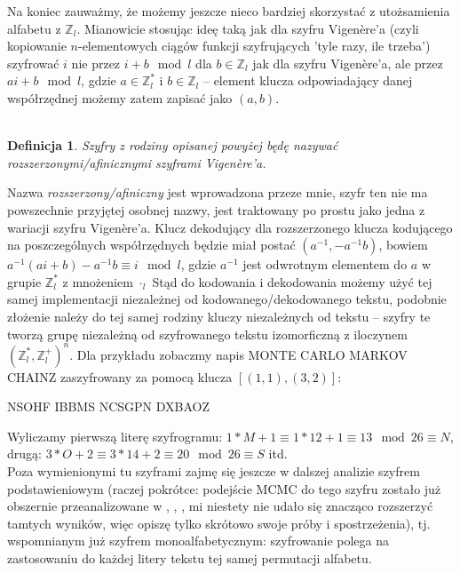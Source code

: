 \documentclass[a4paper]{article}
\theoremstyle{defn}
\newtheorem{defn}{Definicja}[subsection]
\theoremstyle{theorem}
\theoremstyle{lemma}
\theoremstyle{cor}
\theoremstyle{fact}
\begin{document}
Na koniec zauważmy, że możemy jeszcze nieco bardziej skorzystać z utożsamienia alfabetu z $\mathbb{Z}_l$. Mianowicie stosując ideę taką jak dla szyfru Vigenère'a (czyli kopiowanie $n$-elementowych ciągów funkcji szyfrujących 'tyle razy, ile trzeba') szyfrować $i$ nie przez $i+b \mod l$ dla $b \in \mathbb{Z}_l$ jak dla szyfru Vigenère'a, ale przez $ai+b \mod l$, gdzie $a \in \mathbb{Z}_l^*$ i $b \in \mathbb{Z}_l$ – element klucza odpowiadający danej współrzędnej możemy zatem zapisać jako $(a,b)$. \\\\
\begin{defn}\label{defn4.2.3}
Szyfry z rodziny opisanej powyżej będę nazywać \textit{rozszerzonymi/afinicznymi szyframi Vigenère'a}.
\end{defn}
Nazwa \textit{rozszerzony/afiniczny} jest wprowadzona przeze mnie, szyfr ten nie ma powszechnie przyjętej osobnej nazwy, jest traktowany po prostu jako jedna z wariacji szyfru Vigenère'a. Klucz dekodujący dla rozszerzonego klucza kodującego na poszczególnych współrzędnych będzie miał postać $(a^{-1}, -a^{-1}b)$, bowiem $a^{-1}(ai+b) - a^{-1}b \equiv i \mod l$, gdzie $a^{-1}$ jest odwrotnym elementem do $a$ w grupie $\mathbb{Z}_l^*$ z mnożeniem $\cdot_l$ Stąd do kodowania i dekodowania możemy użyć tej samej implementacji niezależnej od kodowanego/dekodowanego tekstu, podobnie złożenie należy do tej samej rodziny kluczy niezależnych od tekstu – szyfry te tworzą grupę niezależną od szyfrowanego tekstu izomorficzną z iloczynem $(\mathbb{Z}_l^*, \mathbb{Z}_l^+)^n$.
Dla przykładu zobaczmy napis MONTE CARLO MARKOV CHAINZ zaszyfrowany za pomocą klucza $[(1,1), (3,2)]$:
\begin{center}
    NSOHF IBBMS NCSGPN DXBAOZ
\end{center}
Wyliczamy pierwszą literę szyfrogramu: $1*M+1 \equiv 1*12+1 \equiv 13 \mod 26 \equiv N$, drugą: $3*O + 2 \equiv 3*14 + 2 \equiv 20 \mod 26 \equiv S$ itd.
\\

Poza wymienionymi tu szyframi zajmę się jeszcze w dalszej analizie szyfrem podstawieniowym (raczej pokrótce: podejście MCMC do tego szyfru zostało już obszernie przeanalizowane w \cite{Diaconis}, \cite{Connor}, \cite{Chen&Rosenthal}, mi niestety nie udało się znacząco rozszerzyć tamtych wyników, więc opiszę tylko skrótowo swoje próby i spostrzeżenia), tj. wspomnianym już szyfrem monoalfabetycznym: szyfrowanie polega na zastosowaniu do każdej litery tekstu tej samej permutacji alfabetu.
\end{document}
